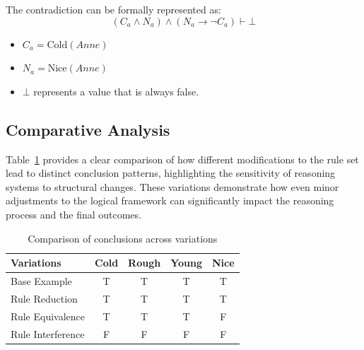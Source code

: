 \documentclass{article} %
\begin{document}
The contradiction can be formally represented as:
\[
(C_a \land N_a) \land (N_a \rightarrow \neg C_a) \vdash \bot
\]

\begin{itemize}
    \item $C_a = \mathrm{Cold}(Anne)$
    \item $N_a = \mathrm{Nice}(Anne)$
    \item $\bot$ represents a value that is always false.
\end{itemize}

\subsection{Comparative Analysis}

Table~\ref{comparison_conclusion} provides a clear comparison of how different modifications to the rule set lead to distinct conclusion patterns, highlighting the sensitivity of reasoning systems to structural changes. These variations demonstrate how even minor adjustments to the logical framework can significantly impact the reasoning process and the final outcomes.

\begin{table}
\centering
\begin{tabular}{|l|c|c|c|c|}
\hline
\textbf{Variations} & \textbf{Cold} & \textbf{Rough} & \textbf{Young} & \textbf{Nice} \\
\hline
Base Example & T & T & T & T \\
Rule Reduction & T & T & T & T \\
Rule Equivalence & T & T & T & F \\
Rule Interference & F & F & F & F \\
\hline
\end{tabular}
\caption{Comparison of conclusions across variations}
\label{comparison_conclusion}
\end{table}
\end{document}

